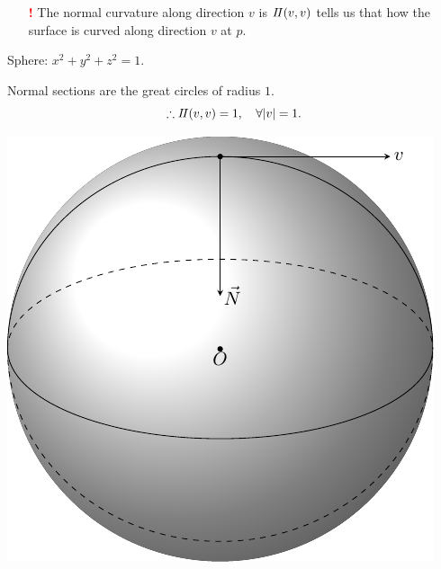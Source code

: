 \begin{itemize}
    \item[{\Large\textcolor{red}{\textbf{!}}}] The normal curvature
    along direction \(v\) is \(I\!I(v,v)\) tells us that how the 
    surface is curved along direction \(v\) at \(p\).
\end{itemize}
\begin{example}\label{normal curvature-sphere}
    Sphere: \(x^2+y^2+z^2=1\).
\end{example}

Normal sections are the great circles of radius \(1\).
         \[\therefore I\!I(v,v)=1,\quad\forall |v|=1.\]
        \begin{center}
            \includegraphics{picture/week7/sphere7.pdf}

\end{center}
